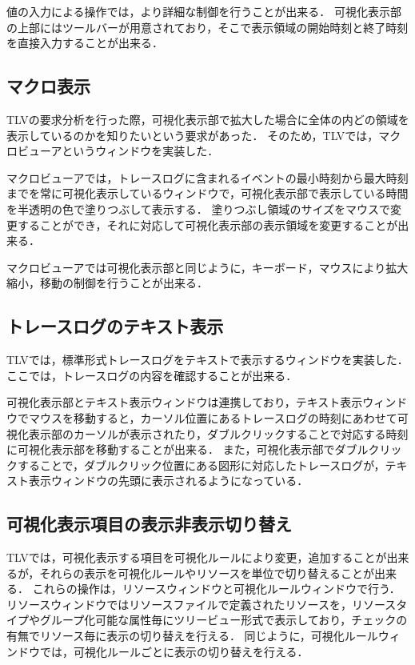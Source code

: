 値の入力による操作では，より詳細な制御を行うことが出来る．
可視化表示部の上部にはツールバーが用意されており，そこで表示領域の開始時刻と終了時刻を直接入力することが出来る．

\subsection{マクロ表示}

TLVの要求分析を行った際，可視化表示部で拡大した場合に全体の内どの領域を表示しているのかを知りたいという要求があった．
そのため，TLVでは，マクロビューアというウィンドウを実装した．

マクロビューアでは，トレースログに含まれるイベントの最小時刻から最大時刻までを常に可視化表示しているウィンドウで，可視化表示部で表示している時間を半透明の色で塗りつぶして表示する．
塗りつぶし領域のサイズをマウスで変更することができ，それに対応して可視化表示部の表示領域を変更することが出来る．

マクロビューアでは可視化表示部と同じように，キーボード，マウスにより拡大縮小，移動の制御を行うことが出来る．

\subsection{トレースログのテキスト表示}

TLVでは，標準形式トレースログをテキストで表示するウィンドウを実装した．
ここでは，トレースログの内容を確認することが出来る．

可視化表示部とテキスト表示ウィンドウは連携しており，テキスト表示ウィンドウでマウスを移動すると，カーソル位置にあるトレースログの時刻にあわせて可視化表示部のカーソルが表示されたり，ダブルクリックすることで対応する時刻に可視化表示部を移動することが出来る．
また，可視化表示部でダブルクリックすることで，ダブルクリック位置にある図形に対応したトレースログが，テキスト表示ウィンドウの先頭に表示されるようになっている．

\subsection{可視化表示項目の表示非表示切り替え}

TLVでは，可視化表示する項目を可視化ルールにより変更，追加することが出来るが，それらの表示を可視化ルールやリソースを単位で切り替えることが出来る．
これらの操作は，リソースウィンドウと可視化ルールウィンドウで行う．
リソースウィンドウではリソースファイルで定義されたリソースを，リソースタイプやグループ化可能な属性毎にツリービュー形式で表示しており，チェックの有無でリソース毎に表示の切り替えを行える．
同じように，可視化ルールウィンドウでは，可視化ルールごとに表示の切り替えを行える．
